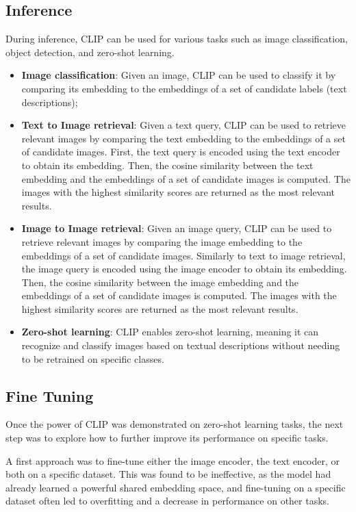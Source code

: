 \subsection{Inference}
During inference, CLIP can be used for various tasks such as image classification, object detection, and zero-shot learning.
\begin{itemize}
    \item \textbf{Image classification}: Given an image, CLIP can be used to classify it by comparing its embedding to the embeddings of a set of candidate labels (text descriptions);
    \item \textbf{Text to Image retrieval}: Given a text query, CLIP can be used to retrieve relevant images by comparing the text embedding to the embeddings of a set of candidate images.
    First, the text query is encoded using the text encoder to obtain its embedding. Then, the cosine similarity between the text embedding and the embeddings of a set of candidate images is computed. 
    The images with the highest similarity scores are returned as the most relevant results.
    \item \textbf{Image to Image retrieval}: Given an image query, CLIP can be used to retrieve relevant images by comparing the image embedding to the embeddings of a set of candidate images.
    Similarly to text to image retrieval, the image query is encoded using the image encoder to obtain its embedding. Then, the cosine similarity between the image embedding and the embeddings of a set of candidate images is computed.
    The images with the highest similarity scores are returned as the most relevant results.
    \item \textbf{Zero-shot learning}: CLIP enables zero-shot learning, meaning it can recognize and classify images based on textual descriptions without needing to be retrained on specific classes.
\end{itemize}

\subsection{Fine Tuning}
Once the power of CLIP was demonstrated on zero-shot learning tasks, the next step was to explore how to further improve its performance on specific tasks.

A first approach was to fine-tune either the image encoder, the text encoder, or both on a specific dataset.
This was found to be ineffective, as the model had already learned a powerful shared embedding space, and fine-tuning on a specific dataset often led 
to overfitting and a decrease in performance on other tasks.

